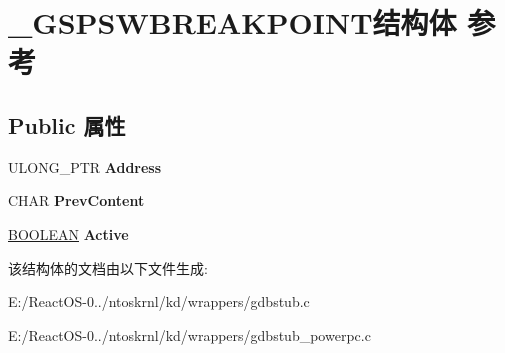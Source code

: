 \hypertarget{struct___g_s_p_s_w_b_r_e_a_k_p_o_i_n_t}{}\section{\+\_\+\+G\+S\+P\+S\+W\+B\+R\+E\+A\+K\+P\+O\+I\+N\+T结构体 参考}
\label{struct___g_s_p_s_w_b_r_e_a_k_p_o_i_n_t}
\subsection*{Public 属性}
\begin{DoxyCompactItemize}
\item 
\mbox{\label{struct___g_s_p_s_w_b_r_e_a_k_p_o_i_n_t_a296e8ec4190a33a65eb36844395a8ee0}} 
U\+L\+O\+N\+G\+\_\+\+P\+TR {\bfseries Address}
\item 
\mbox{\label{struct___g_s_p_s_w_b_r_e_a_k_p_o_i_n_t_a1a21870b83f1e08be38e330a485bc203}} 
C\+H\+AR {\bfseries Prev\+Content}
\item 
\mbox{\label{struct___g_s_p_s_w_b_r_e_a_k_p_o_i_n_t_a60dc4b45e208d4ae7fba4f4d88e317a6}} 
\hyperlink{_processor_bind_8h_a112e3146cb38b6ee95e64d85842e380a}{B\+O\+O\+L\+E\+AN} {\bfseries Active}
\end{DoxyCompactItemize}


该结构体的文档由以下文件生成\+:\begin{DoxyCompactItemize}
\item 
E\+:/\+React\+O\+S-\/0../ntoskrnl/kd/wrappers/gdbstub.\+c\item 
E\+:/\+React\+O\+S-\/0../ntoskrnl/kd/wrappers/gdbstub\+\_\+powerpc.\+c\end{DoxyCompactItemize}
